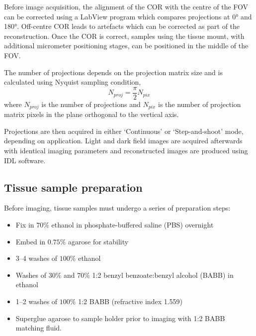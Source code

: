 Before image acquisition, the alignment of the COR with the centre of the FOV can be corrected using a LabView program which compares projections at \ang{0} and \ang{180}. Off-centre COR leads to artefacts which can be corrected as part of the reconstruction. 
Once the COR is correct, samples using the tissue mount, with additional micrometer positioning stages, can  be positioned in the middle of the FOV.

The number of projections depends on the projection matrix size and is calculated using Nyquist sampling condition,
\begin{equation}
N_{proj} = \frac{\pi}{2} N_{pix}
\end{equation} 
where $N_{proj}$ is the number of projections and $N_{pix}$ is the number of projection matrix pixels in the plane orthogonal to the vertical axis.


Projections are then acquired in either `Continuous' or `Step-and-shoot' mode, depending on application. Light and dark field images are acquired afterwards with identical imaging parameters and reconstructed images are produced using IDL software. 








\subsection{Tissue sample preparation}



Before imaging, tissue samples must undergo a series of preparation steps:
\begin{itemize}
	\item Fix in $70\%$ ethanol in phosphate-buffered saline (PBS) overnight
	\item Embed in $0.75\%$ agarose for stability
	\item 3--4 washes of $100\%$ ethanol
	\item Washes of $30\%$ and $70\%$ 1:2 benzyl benzoate:benzyl alcohol (BABB) in ethanol
	\item 1--2 washes of $100\%$ 1:2 BABB (refractive index 1.559)
	\item Superglue agarose to sample holder prior to imaging with 1:2 BABB matching fluid.
\end{itemize}







